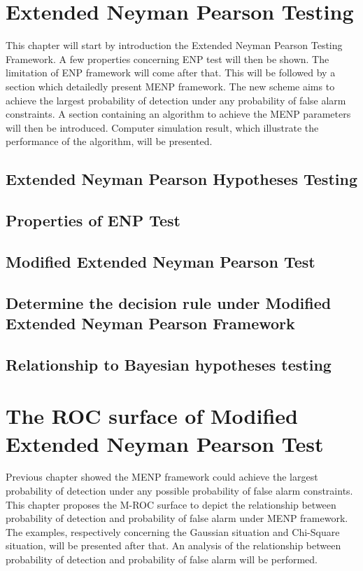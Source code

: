 \documentclass{article}
\begin{document}
\begin{spacing}{2.0}
\section{Extended Neyman Pearson Testing }
This chapter will start by introduction the Extended Neyman Pearson Testing Framework. A few properties concerning ENP test will then be shown. The limitation of ENP framework will come after that. This will be followed by a section which detailedly present MENP framework. The new scheme aims to achieve the largest probability of detection under any probability of false alarm constraints. A section containing an algorithm to achieve the MENP parameters will then be introduced. Computer simulation result, which illustrate the performance of the algorithm, will be presented.  
\subsection{Extended Neyman Pearson Hypotheses Testing}
\subsection{Properties of ENP Test}
\subsection{Modified Extended Neyman Pearson Test}
\subsection{Determine the decision rule under Modified Extended Neyman Pearson Framework}
\subsection{Relationship to Bayesian hypotheses testing}
\newpage
\section{The ROC surface of Modified Extended Neyman Pearson Test}
Previous chapter showed the MENP framework could achieve the largest probability of detection under any possible probability of false alarm constraints.  This chapter proposes the M-ROC surface to depict the relationship between probability of detection and probability of false alarm under MENP framework. The examples, respectively concerning the Gaussian situation and Chi-Square situation, will be presented after that. An analysis of the relationship between probability of detection and probability of false alarm will be performed.  

\end{spacing}
\end{document}
